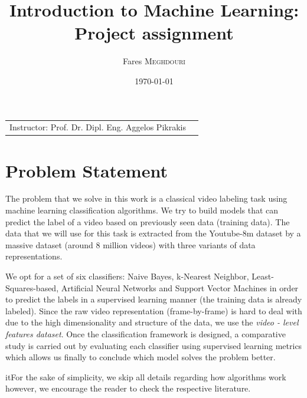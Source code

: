 \documentclass{article}
\title{Introduction to Machine Learning:\\ Project assignment} %
\author{Fares \textsc{Meghdouri}} %
\date{\today} %
\begin{document}
\maketitle %

\begin{center}
\begin{tabular}{l r}
Instructor: Prof. Dr. Dipl. Eng. Aggelos
Pikrakis %
\end{tabular}
\end{center}



\section{Problem Statement}
The problem that we solve in this work is a classical video labeling task using machine learning classification algorithms. We try to build models that can predict the label of a video based on previously seen data (training data). The data that we will use for this task is extracted from the Youtube-8m dataset by \cite{abu2016youtube} a massive dataset (around 8 million videos) with three variants of data representations.

We opt for a set of six classifiers: Naive Bayes, k-Nearest Neighbor, Least-Squares-based, Artificial Neural Networks and Support Vector Machines in order to predict the labels in a supervised learning manner (the training data is already labeled). Since the raw video representation (frame-by-frame) is hard to deal with due to the high dimensionality and structure of the data, we use the \emph{video - level features dataset}. Once the classification framework is designed, a comparative study is carried out by evaluating each classifier using supervised learning metrics which allows us finally to conclude which model solves the problem better.

\text it{For the sake of simplicity, we skip all details regarding how algorithms work however, we encourage the reader to check the respective literature.}
\end{document}
